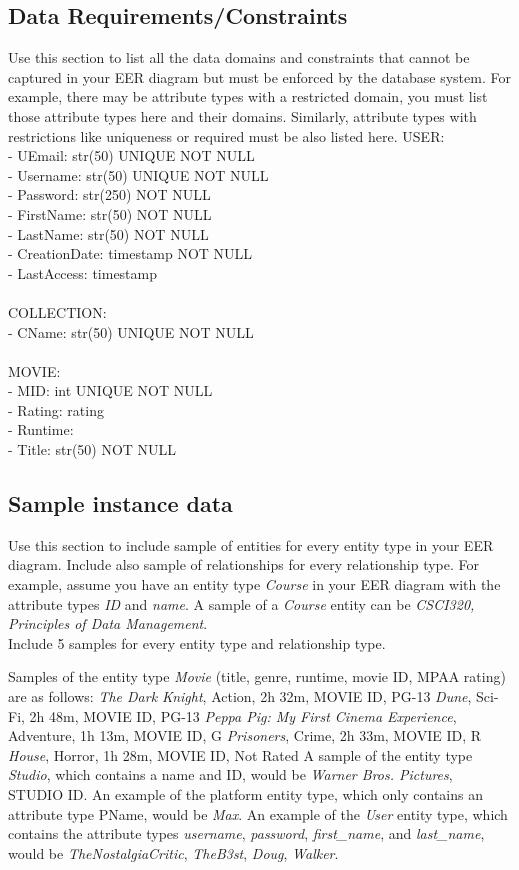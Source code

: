 \documentclass[12pt]{article}
\begin{document}
\subsection{Data Requirements/Constraints}
Use this section to list all the data domains and constraints that cannot be captured in your EER diagram but must be enforced by the database system. For example, there may be attribute types with a restricted domain, you must list those attribute types here and their domains. Similarly, attribute types with restrictions like uniqueness or required must be also listed here.
USER:\\
- UEmail: str(50) UNIQUE NOT NULL\\
- Username: str(50) UNIQUE NOT NULL\\
- Password: str(250) NOT NULL\\
- FirstName: str(50) NOT NULL\\
- LastName: str(50) NOT NULL\\
- CreationDate: timestamp NOT NULL\\
- LastAccess: timestamp\\
\\
COLLECTION:\\
- CName: str(50) UNIQUE NOT NULL\\
\\
MOVIE:\\
- MID: int UNIQUE NOT NULL\\
- Rating: rating\\
- Runtime: \\
- Title: str(50) NOT NULL\\


\subsection{Sample instance data}
Use this section to include sample of entities for every entity type in your EER diagram. Include also sample of relationships for every relationship type. For example, assume you have an entity type \emph{Course} in your EER diagram with the attribute types \emph{ID} and \emph{name}. A sample of a \emph{Course} entity can be \emph{CSCI320, Principles of Data Management}.\\

Include 5 samples for every entity type and relationship type.

Samples of the entity type \emph{Movie} (title, genre, runtime, movie ID, MPAA rating) are as follows:
\emph{The Dark Knight}, Action, 2h 32m, MOVIE ID, PG-13
\emph{Dune}, Sci-Fi, 2h 48m, MOVIE ID, PG-13
\emph{Peppa Pig: My First Cinema Experience}, Adventure, 1h 13m, MOVIE ID, G
\emph{Prisoners}, Crime, 2h 33m, MOVIE ID, R
\emph{House}, Horror, 1h 28m, MOVIE ID, Not Rated
A sample of the entity type \textit{Studio}, which contains a name and ID, would be \textit{Warner Bros. Pictures}, STUDIO ID. 
An example of the platform entity type, which only contains an attribute type PName, would be \emph{Max}. 
An example of the \emph{User} entity type, which contains the attribute types \emph{username}, \emph{password}, \emph{first_name}, and \emph{last_name}, would be \emph{TheNostalgiaCritic}, \emph{TheB3st}, \emph{Doug}, \emph{Walker}.
\end{document}
